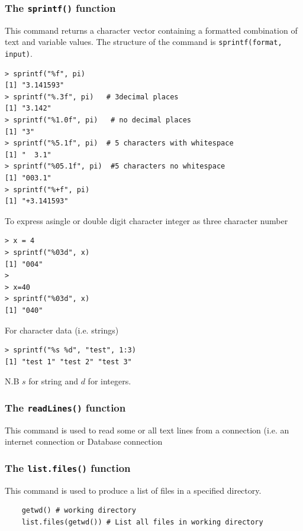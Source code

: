 \subsubsection*{The \texttt{sprintf()} function}
This command returns a character vector containing a formatted combination of text and variable values. The structure of the command is \texttt{sprintf(format, input)}.
\begin{verbatim}
> sprintf("%f", pi)     
[1] "3.141593"
> sprintf("%.3f", pi)   # 3decimal places
[1] "3.142"
> sprintf("%1.0f", pi)   # no decimal places
[1] "3"
> sprintf("%5.1f", pi)  # 5 characters with whitespace
[1] "  3.1"  
> sprintf("%05.1f", pi)  #5 characters no whitespace
[1] "003.1"
> sprintf("%+f", pi)
[1] "+3.141593"
\end{verbatim}

\noindent To express asingle or double digit character integer as three character number
\begin{verbatim}
> x = 4
> sprintf("%03d", x)
[1] "004"
> 
> x=40
> sprintf("%03d", x)
[1] "040"
\end{verbatim}

\noindent For character data (i.e. strings) 
\begin{verbatim}
> sprintf("%s %d", "test", 1:3)
[1] "test 1" "test 2" "test 3"
\end{verbatim}
N.B $s$ for string and $d$ for integers.
\newpage
\subsubsection*{The \texttt{readLines()} function}

This command is used to read some or all text lines from a connection (i.e.
an internet connection or Database connection
\subsubsection*{The \texttt{list.files()} function}
This command is used to produce a list of files in a specified directory.
\begin{framed}
	\begin{verbatim}
	getwd() # working directory
	list.files(getwd()) # List all files in working directory
	\end{verbatim}
\end{framed}
\newpage

